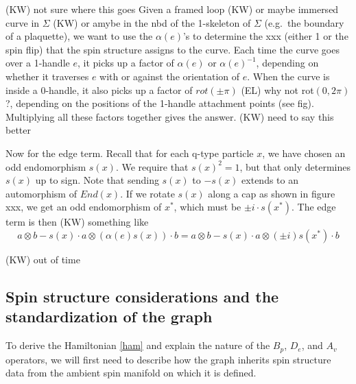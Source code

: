 \documentclass[12pt,a4paper]{article}
\newcommand\be            {\begin{equation}}
\newcommand\ee            {\end{equation}}
\newcommand{\ethan}[1]{{\color{amethyst}\footnotesize{(EL) #1}}}
\newcommand{\kw}[1]{{\color{kwcolor}\footnotesize{(KW) #1}}}
\begin{document}
\kw{not sure where this goes}
Given a framed loop \kw{or maybe immersed curve} in $\Sigma$ 
\kw{or amybe in the nbd of the 1-skeleton of $\Sigma$} (e.g.\ the boundary of a plaquette), 
we want to use the $\alpha(e)$'s
to determine the xxx (either 1 or the spin flip) that the spin structure assigns to the curve.
Each time the curve goes over a 1-handle $e$, it picks up a factor of $\alpha(e)$
or $\alpha(e)^{-1}$, depending on whether it traverses $e$ with or against the orientation of $e$.
When the curve is inside a 0-handle, it also picks up a factor
of $rot(\pm\pi)$ \ethan{why not rot$(0,2\pi)$?}, depending on the positions of the 1-handle attachment points (see fig).
Multiplying all these factors together gives the answer.
\kw{need to say this better}

Now for the edge term.
Recall that for each q-type particle $x$, we have chosen an odd endomorphism $s(x)$.
We require that $s(x)^2 = 1$, but that only determines $s(x)$ up to sign.
Note that sending $s(x)$ to $-s(x)$ extends to an automorphism of $End(x)$.
If we rotate $s(x)$ along a cap as shown in figure xxx, we get an odd endomorphism of $x^*$,
which must be $\pm i \cdot s(x^*)$.
The edge term is then \kw{something like}
\be
	a\otimes b - s(x)\cdot a \otimes (\alpha(e)s(x)) \cdot b = a\otimes b - s(x)\cdot a \otimes (\pm i) s(x^*) \cdot b
\ee


\kw{out of time}





\subsection{Spin structure considerations and the standardization of the graph} \label{standardized_handles}



To derive the Hamiltonian \eqref{ham} and explain the nature of the $B_p$, $D_e$, and $A_v$ operators, we will first need to describe how the graph inherits spin structure data from the ambient spin manifold on which it is defined. 
\end{document}

